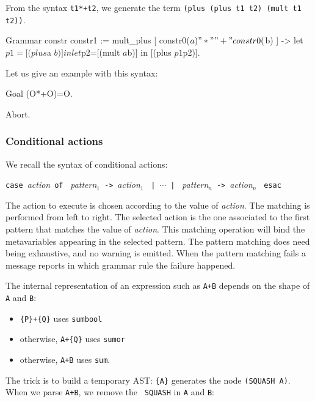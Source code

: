 \example{}

\noindent From the syntax \verb|t1*+t2|, we generate the term
{\tt (plus (plus t1 t2) (mult t1 t2))}.

\begin{coq_example}
Grammar constr constr1 := 
  mult_plus [ constr0($a) "*" "+" constr0($b) ]
     -> let $p1=[(plus $a $b)] in
        let $p2=[(mult $a $b)] in 
          [(plus $p1 $p2)].
\end{coq_example}

Let us give an example with this syntax:

\begin{coq_example}
Goal (O*+O)=O.
\end{coq_example}
\begin{coq_eval}
Abort.
\end{coq_eval}

\subsubsection{Conditional actions}

We recall the syntax of conditional actions:

\begin{center}
\texttt{case}~\textsl{action}~\texttt{of}~%
\textsl{pattern}$_1$~\verb+->+~\textsl{action}$_1$~%
\texttt{|}~$\cdots$~\texttt{|}~%
\textsl{pattern}$_n$~\verb+->+~\textsl{action}$_n$~%
\texttt{esac}
\end{center}

The action to execute is chosen according to the value of
\textsl{action}. The matching is performed from left to right. The
selected action is the one associated to the first pattern that
matches the value of \textsl{action}. This matching operation will
bind the metavariables appearing in the selected pattern. The pattern
matching does need being exhaustive, and no warning is emitted. When the
pattern matching fails a message reports in which grammar rule the
failure happened.


The internal representation of an expression such as {\tt A+B} depends
on the shape of {\tt A} and {\tt B}:
\begin{itemize}
\item \verb/{P}+{Q}/ uses {\tt sumbool}
\item otherwise, \verb/A+{Q}/ uses {\tt sumor}
\item otherwise, \verb/A+B/ uses {\tt sum}.
\end{itemize}
The trick is to build a temporary AST: \verb/{A}/ generates the node
\verb/(SQUASH A)/. When we parse \verb/A+B/, we remove the {\tt
SQUASH} in {\tt A} and {\tt B}:

